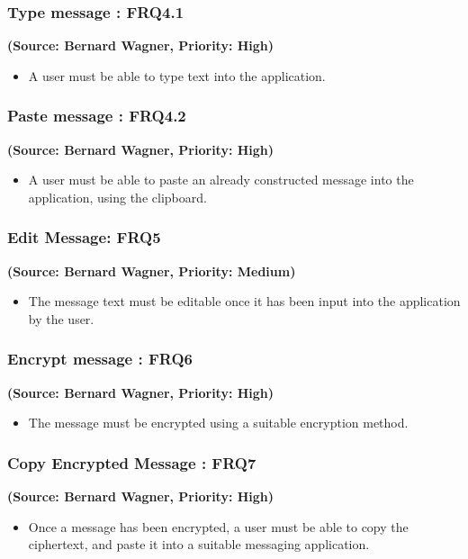 \subsubsection{Type message : FRQ4.1}
\textbf{(Source: Bernard Wagner, Priority: High)}
\begin{itemize}
\item A user must be able to type text into the application.
\end{itemize}
\subsubsection{Paste message : FRQ4.2}
\textbf{(Source: Bernard Wagner, Priority: High)}
\begin{itemize}
\item A user must be able to paste an already constructed message into the application, using the clipboard.
\end{itemize}
\subsubsection{Edit Message: FRQ5}
\textbf{(Source: Bernard Wagner, Priority: Medium)}
\begin{itemize}
\item The message text must be editable once it has been input into the application by the user.
\end{itemize}
\subsubsection{Encrypt message : FRQ6}
\textbf{(Source: Bernard Wagner, Priority: High)}
\begin{itemize}
\item The message must be encrypted using a suitable encryption method.
\end{itemize}
\subsubsection{Copy Encrypted Message : FRQ7}
\textbf{(Source: Bernard Wagner, Priority: High)}
\begin{itemize}
\item Once a message has been encrypted, a user must be able to copy the ciphertext, and paste it into a suitable messaging application.
\end{itemize}
